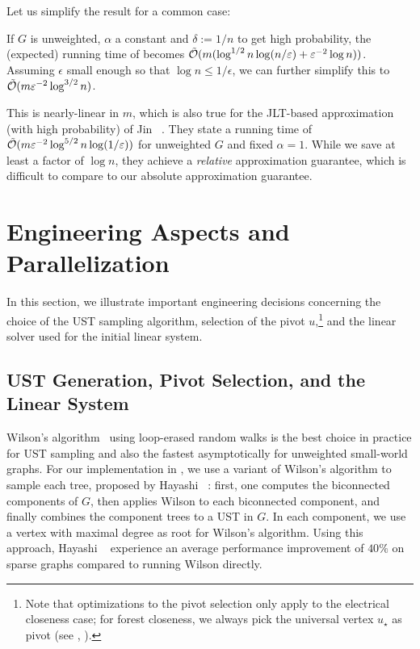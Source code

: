 Let us simplify the result for a common case:

\begin{corollary}
If $G$ is unweighted, $\alpha$ a constant and $\delta := 1/n$ to get high probability,
the (expected) running time of  becomes
$\tilde{\mathcal{O}}(m(\log^{1/2}n \log(n /\varepsilon) + \varepsilon^{-2}\log n))$.
Assuming $\epsilon$ small enough so that $\log n \le 1/\epsilon$, we can further
simplify this to $\tilde{\mathcal{O}}(m\varepsilon^{-2}\log^{3/2}n)$.
\end{corollary}

This is nearly-linear in $m$, which is also true for the JLT-based approximation
(with high probability) of Jin \etal~\cite{DBLP:conf/icdm/JinBZ19}.
They state a running time of $\tilde{\mathcal{O}}(m\varepsilon^{-2}\log^{5/2}n\log(1/\varepsilon))$
for unweighted $G$ and fixed $\alpha = 1$. While we save at least a factor of
$\log n$, they achieve a \emph{relative} approximation guarantee, which is difficult
to compare to our absolute approximation guarantee.


\section{Engineering Aspects and Parallelization}
\label{sec:el-clos:eng}
In this section, we illustrate important engineering decisions concerning the choice
of the UST sampling algorithm, selection of the pivot $u$,\footnote{Note that
optimizations to the pivot selection only apply to the electrical closeness case;
for forest closeness, we always pick the universal vertex $u_\star$
as pivot (see , ).} and the
linear solver used for the initial linear system.

\subsection{UST Generation, Pivot Selection, and the Linear System}
%
Wilson's algorithm~\cite{DBLP:conf/stoc/Wilson96} using loop-erased random walks is the
best choice in practice for UST sampling and also the fastest asymptotically for unweighted
small-world graphs.
For our implementation in , we use a variant of
Wilson's algorithm to sample each tree, proposed by Hayashi
\etal~\cite{DBLP:conf/ijcai/HayashiAY16}: first, one computes the biconnected
components of $G$, then applies Wilson to each biconnected component, and
finally combines the component trees to a UST in $G$. In each component, we use
a vertex with maximal degree as root for Wilson's algorithm. Using this
approach, Hayashi \etal~\cite{DBLP:conf/ijcai/HayashiAY16} experience an
average performance improvement of $40\%$ on sparse graphs compared to running
Wilson directly.

